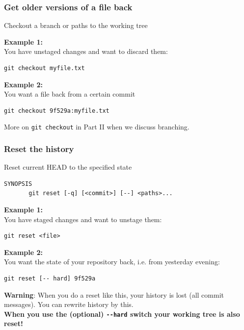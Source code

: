 \documentclass{gittalk}
\newcommand{\hlcommand}[1]{ %
\colorbox{base3}{\small \texttt{#1}}
}
\begin{document}
\begin{frame}[fragile]
\frametitle{Get older versions of a file back}
\begin{tcolorbox}[title=git checkout]
Checkout a branch or paths to the working tree
\end{tcolorbox}
\vspace*{1em}
\textbf{Example 1:}\\
You have unstaged changes and want to discard them:\\[0.5em]
\begin{lstlisting}[basicstyle=\normalsize\ttfamily]
git checkout myfile.txt
\end{lstlisting}
\vspace*{1em}
\textbf{Example 2:}\\
You want a file back from a certain commit\\[0.5em]
\begin{lstlisting}[basicstyle=\normalsize\ttfamily]
git checkout 9f529a:myfile.txt
\end{lstlisting}
\vspace*{1em}
More on \hlcommand{git checkout} in Part II when we discuss branching.
\end{frame}

\begin{frame}[fragile]
\frametitle{Reset the history}
\begin{tcolorbox}[title=git reset]
Reset current HEAD to the specified state
\begin{lstlisting}
SYNOPSIS
       git reset [-q] [<commit>] [--] <paths>...
\end{lstlisting}
\end{tcolorbox}
\vspace*{0.2em}
\textbf{Example 1:}\\ 
You have staged changes and want to unstage them:
\begin{lstlisting}
git reset <file>
\end{lstlisting}
\textbf{Example 2:}\\
You want the state of your repository back, i.e. from yesterday evening:
\begin{lstlisting}
git reset [-- hard] 9f529a
\end{lstlisting}
{\small \textbf{Warning}: When you do a reset like this, your history is lost
(all commit messages). You can rewrite history by this.\\
\textbf{When you use the (optional) \texttt{-{}-hard} switch your working tree is also reset!}}
\end{frame}
\end{document}
